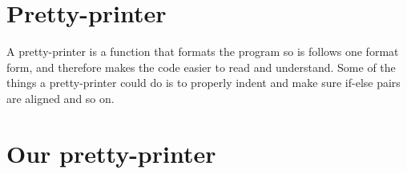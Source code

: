 \section{Pretty-printer}
A pretty-printer is a function that formats the program so is follows one format form, and therefore makes the code easier to read and understand. Some of the things a pretty-printer could do is to properly indent and make sure if-else pairs are aligned and so on.

\section{Our pretty-printer}
